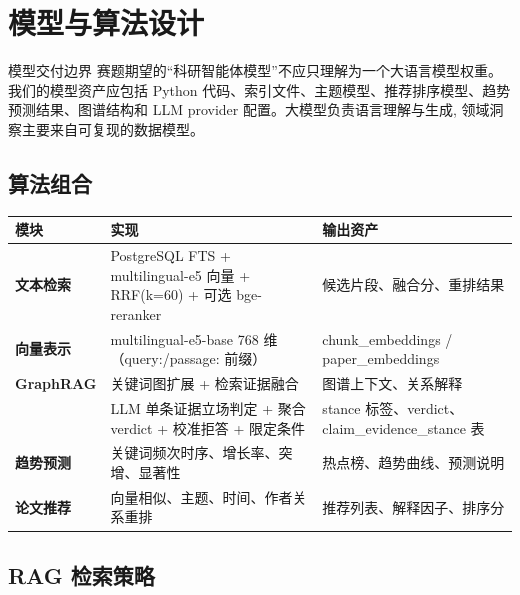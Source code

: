 \section{模型与算法设计}

\begin{designbox}{模型交付边界}
赛题期望的“科研智能体模型”不应只理解为一个大语言模型权重。我们的模型资产应包括 Python 代码、索引文件、主题模型、推荐排序模型、趋势预测结果、图谱结构和 LLM provider 配置。大模型负责语言理解与生成, 领域洞察主要来自可复现的数据模型。
\end{designbox}

\subsection{算法组合}

\begin{center}
\begin{tabularx}{\textwidth}{>{\bfseries}p{29mm}X X}
\toprule
模块 & 实现 & 输出资产 \\
\midrule
文本检索 & PostgreSQL FTS + multilingual-e5 向量 + RRF(k=60) + 可选 bge-reranker & 候选片段、融合分、重排结果 \\
向量表示 & multilingual-e5-base 768 维（query:/passage: 前缀） & chunk\_embeddings / paper\_embeddings \\
GraphRAG & 关键词图扩展 + 检索证据融合 & 图谱上下文、关系解释 \\
\multicolumn{1}{l}{\textbf{Stance 判定}} & \multicolumn{1}{l}{LLM 单条证据立场判定 + 聚合 verdict + 校准拒答 + 限定条件} & \multicolumn{1}{l}{stance 标签、verdict、claim\_evidence\_stance 表}\\
趋势预测 & 关键词频次时序、增长率、突增、显著性 & 热点榜、趋势曲线、预测说明 \\
论文推荐 & 向量相似、主题、时间、作者关系重排 & 推荐列表、解释因子、排序分 \\
\bottomrule
\end{tabularx}
\end{center}

\subsection{RAG 检索策略}

